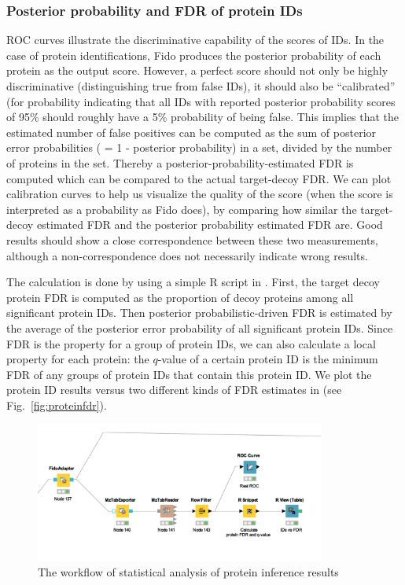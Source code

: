 \subsubsection{Posterior probability and FDR of protein IDs}
ROC curves illustrate the discriminative capability of the scores of IDs. 
In the case of protein identifications, Fido produces the posterior probability of each protein as the output score.
However, a perfect score should not only be highly discriminative (distinguishing true from false IDs), 
it should also be ``calibrated'' (for probability indicating that all IDs with reported posterior probability scores 
of 95\% 
should roughly have a 5\% probability of being false. This implies that the estimated number of false positives can 
be computed as the sum
of posterior error probabilities ( = 1 - posterior probability) in a set, divided by the number of proteins in the 
set. Thereby a posterior-probability-estimated FDR is computed which can be compared to the actual target-decoy FDR.
We can plot calibration curves to help us visualize the
quality of the score (when the score is interpreted as a probability as Fido does), by comparing how similar the 
target-decoy estimated FDR and the posterior probability estimated FDR are. Good results should show a close 
correspondence between these two measurements, although a non-correspondence does not necessarily indicate wrong 
results. 

The calculation is done by using a simple R script in . 
First, the target decoy protein FDR is computed as the proportion of decoy proteins among all significant protein 
IDs. 
Then posterior probabilistic-driven FDR is estimated by the average of the posterior error probability of all 
significant protein IDs. Since FDR is the property for a group of protein IDs, we can also calculate a local 
property for each protein: the $q$-value of a certain protein ID is the minimum FDR of any groups of protein IDs that 
contain this protein ID. 
We plot the protein ID results versus two different kinds of FDR estimates in  (see Fig.~\ref{fig:proteinfdr}).

\begin{figure}[htbp]
  \centering
  \includegraphics[width=0.85\textwidth]{graphics/protein_inference/inference_metanode.png}
  \caption{The workflow of statistical analysis of protein inference results}
  \label{fig:proteininference}
\end{figure}

